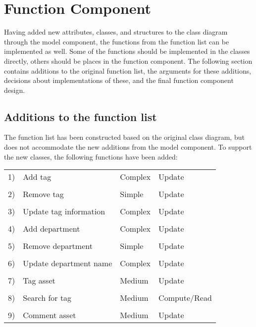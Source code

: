 \section{Function Component} \label{sc:function_component}
Having added new attributes, classes, and structures to the class diagram through the model component, the functions from the function list can be implemented as well. Some of the functions should be implemented in the classes directly, others should be places in the function component. The following section contains additions to the original function list, the arguments for these additions, decisions about implementations of these, and the final function component design.
\par
\subsection{Additions to the function list}
The function list has been constructed based on the original class diagram, but does not accommodate the new additions from the model component. To support the new classes, the following functions have been added:

\begin{table}[H]
\centering
    \begin{tabular}{r l l l}
        1) & Add tag & Complex & Update\\
        \\
        2) & Remove tag & Simple & Update\\
        \\
        3) & Update tag information & Complex & Update\\
        \\
        4) & Add department & Complex & Update\\
        \\
        5) & Remove department & Simple & Update\\
        \\
        6) & Update department name & Complex & Update\\
        \\
        7) & Tag asset & Medium & Update\\
        \\
        8) & Search for tag & Medium & Compute/Read\\
        \\
        9) & Comment asset & Medium & Update
    \end{tabular}
\end{table}

